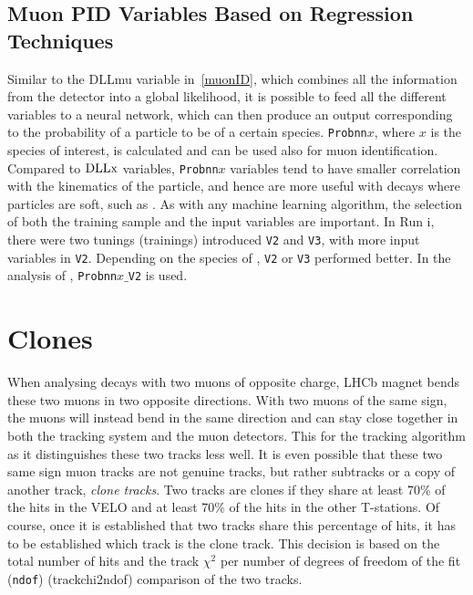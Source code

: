 \subsection{Muon PID Variables Based on Regression Techniques }
\label{muonPIDprobnn}
Similar to the DLLmu variable in~\autoref{muonID}, which combines all the information from the detector into a global likelihood, it is possible to feed all the different variables to a neural network, which can then produce an output corresponding to the probability of a particle to be of a certain species. \texttt{Probnn${x}$}, where $x$ is the species of interest, is calculated and can be used also for muon identification. Compared to $\rm{DLLx}$ variables, \texttt{Probnn${x}$} variables tend to have smaller correlation with the kinematics of the particle, and hence are more useful with decays where particles are soft, such as \Bmumumu. As with any machine learning algorithm, the selection of both the training sample and the input variables are important. In Run \Rn{1}, there were two tunings (trainings) introduced \texttt{V2} and \texttt{V3}, with more input variables in \texttt{V2}. Depending on the species of \DIFdelbegin {}\DIFdelend \DIFaddbegin {}\DIFaddend , \texttt{V2} or \texttt{V3} performed better. In the analysis of \Bmumumu, \texttt{Probnn${x}\_$V2} is used.


\section{Clones}
\label{cloniatkos}
When analysing decays with two muons of opposite charge, \DIFdelbegin {}\DIFdelend \DIFaddbegin {}\DIFaddend \gls{LHCb} magnet bends these two muons in two opposite directions. With two muons of the same sign, the muons will instead bend in the same direction and can stay close together in both the tracking system and the muon detectors. This \DIFdelbegin {}\DIFdelend \DIFaddbegin {}\DIFaddend for the tracking algorithm as it distinguishes these two tracks less well. It is even possible that these two same sign muon tracks are not genuine tracks, but rather subtracks or a copy of another track, \textit{clone tracks}. Two tracks are clones if they share at least 70\% of the hits in the \gls{VELO} and at least 70\% of the hits in the other T-stations. Of course, once it is established that two tracks share this percentage of hits, it has to be established which track is the clone track. This decision is based on the total number of hits and the track $\chi^{2}$ per number of degrees of freedom of the fit (\texttt{ndof}) (\gls{trackchi2ndof}) comparison of the two tracks.   



